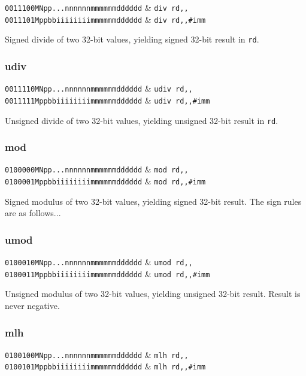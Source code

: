 \decfmt
\texttt{0011100MNpp...nnnnnnmmmmmmdddddd} & \texttt{div rd,,} \\
\texttt{0011101Mppbbiiiiiiiimmmmmmdddddd} & \texttt{div rd,,\#imm}
\finfmt

Signed divide of two 32-bit values, yielding signed 32-bit result in \texttt{rd}.

\subsubsection{udiv}

\decfmt
\texttt{0011110MNpp...nnnnnnmmmmmmdddddd} & \texttt{udiv rd,,} \\
\texttt{0011111Mppbbiiiiiiiimmmmmmdddddd} & \texttt{udiv rd,,\#imm}
\finfmt

Unsigned divide of two 32-bit values, yielding unsigned 32-bit result in \texttt{rd}.

\subsubsection{mod}

\decfmt
\texttt{0100000MNpp...nnnnnnmmmmmmdddddd} & \texttt{mod rd,,} \\
\texttt{0100001Mppbbiiiiiiiimmmmmmdddddd} & \texttt{mod rd,,\#imm}
\finfmt

Signed modulus of two 32-bit values, yielding signed 32-bit result. The sign rules are as follows...

\subsubsection{umod}

\decfmt
\texttt{0100010MNpp...nnnnnnmmmmmmdddddd} & \texttt{umod rd,,} \\
\texttt{0100011Mppbbiiiiiiiimmmmmmdddddd} & \texttt{umod rd,,\#imm}
\finfmt

Unsigned modulus of two 32-bit values, yielding unsigned 32-bit result. Result is never negative.

\subsubsection{mlh}

\decfmt
\texttt{0100100MNpp...nnnnnnmmmmmmdddddd} & \texttt{mlh rd,,} \\
\texttt{0100101Mppbbiiiiiiiimmmmmmdddddd} & \texttt{mlh rd,,\#imm}
\finfmt

